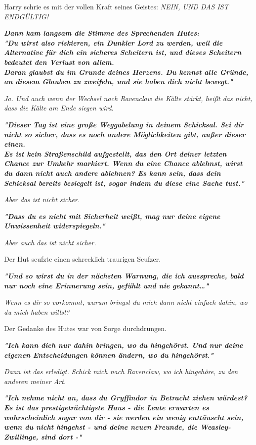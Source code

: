 {Harry schrie es mit der vollen Kraft seines Geistes: \emph{NEIN, UND DAS IST ENDGÜLTIG!}

\textbf{\emph{Dann kam langsam die Stimme des Sprechenden Hutes:\\ "Du wirst also riskieren, ein Dunkler Lord zu werden, weil die Alternative für dich ein sicheres Scheitern ist, und dieses Scheitern bedeutet den Verlust von allem.\\ Daran glaubst du im Grunde deines Herzens. Du kennst alle Gründe, an diesem Glauben zu zweifeln, und sie haben dich nicht bewegt."}}

\emph{Ja. Und auch wenn der Wechsel nach Ravenclaw die Kälte stärkt, heißt das nicht, dass die Kälte am Ende siegen wird.}

\textbf{\emph{"Dieser Tag ist eine große Weggabelung in deinem Schicksal. Sei dir nicht so sicher, dass es noch andere Möglichkeiten gibt, außer dieser einen.\\ Es ist kein Straßenschild aufgestellt, das den Ort deiner letzten Chance zur Umkehr markiert. Wenn du eine Chance ablehnst, wirst du dann nicht auch andere ablehnen? Es kann sein, dass dein Schicksal bereits besiegelt ist, sogar indem du diese eine Sache tust."}}

\emph{Aber das ist nicht sicher.}

\textbf{\emph{"Dass du es nicht mit Sicherheit weißt, mag nur deine eigene Unwissenheit widerspiegeln."}}

\emph{Aber auch das ist nicht sicher.}

Der Hut seufzte einen schrecklich traurigen Seufzer.

\textbf{\emph{"Und so wirst du in der nächsten Warnung, die ich ausspreche, bald nur noch eine Erinnerung sein, gefühlt und nie gekannt…"}}

\emph{Wenn es dir so vorkommt, warum bringst du mich dann nicht einfach dahin, wo du mich haben willst?}

Der Gedanke des Hutes war von Sorge durchdrungen.

\textbf{\emph{"Ich kann dich nur dahin bringen, wo du hingehörst. Und nur deine eigenen Entscheidungen können ändern, wo du hingehörst."}}

\emph{Dann ist das erledigt. Schick mich nach Ravenclaw, wo ich hingehöre, zu den anderen meiner Art.}

\textbf{\emph{"Ich nehme nicht an, dass du Gryffindor in Betracht ziehen würdest? Es ist das prestigeträchtigste Haus - die Leute erwarten es wahrscheinlich sogar von dir - sie werden ein wenig enttäuscht sein, wenn du nicht hingehst - und deine neuen Freunde, die Weasley-Zwillinge, sind dort -"}}

}
